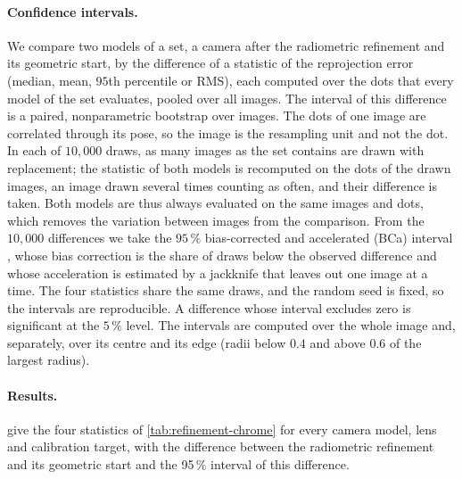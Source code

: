 \paragraph{Confidence intervals.}
We compare two models of a set, \eg a camera after the radiometric refinement and its geometric start, by the difference of a statistic of the reprojection error (median, mean, $95$th percentile or RMS), each computed over the dots that every model of the set evaluates, pooled over all images. The interval of this difference is a paired, nonparametric bootstrap over images. The dots of one image are correlated through its pose, so the image is the resampling unit and not the dot. In each of $10{,}000$ draws, as many images as the set contains are drawn with replacement; the statistic of both models is recomputed on the dots of the drawn images, an image drawn several times counting as often, and their difference is taken. Both models are thus always evaluated on the same images and dots, which removes the variation between images from the comparison. From the $10{,}000$ differences we take the $95\,\%$ bias-corrected and accelerated (BCa) interval \cite{efron1987better}, whose bias correction is the share of draws below the observed difference and whose acceleration is estimated by a jackknife that leaves out one image at a time. The four statistics share the same draws, and the random seed is fixed, so the intervals are reproducible. A difference whose interval excludes zero is significant at the $5\,\%$ level. The intervals are computed over the whole image and, separately, over its centre and its edge (radii below $0.4$ and above $0.6$ of the largest radius).


\paragraph{Results.}
 give the four statistics of \cref{tab:refinement-chrome} for every camera model, lens and calibration target, with the difference between the radiometric refinement and its geometric start and the 95\,\% interval of this difference.

